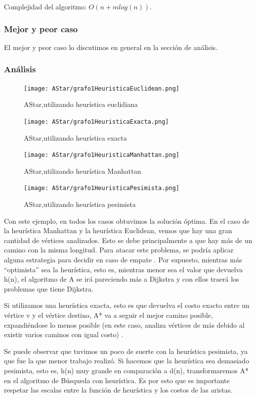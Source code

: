 Complejidad del algoritmo: $O(n + mlog(n))$.

\subsubsection{Mejor y peor caso}
El mejor y peor caso lo discutimos en general en la sección de análisis.
\subsubsection{Análisis}
\begin{figure}[H]
\centering
\texttt{[image: AStar/grafo1HeuristicaEuclidean.png]}
\caption{AStar,utilizando heurística euclidiana}
\end{figure}

\begin{figure}[H]
\centering
\texttt{[image: AStar/grafo1HeuristicaExacta.png]}
\caption{AStar,utilizando heurística exacta}
\end{figure}

\begin{figure}[H]
\centering
\texttt{[image: AStar/grafo1HeuristicaManhattan.png]}
\caption{AStar,utilizando heurística Manhattan}
\end{figure}

\begin{figure}[H]
\centering
\texttt{[image: AStar/grafo1HeuristicaPesimista.png]}
\caption{AStar,utilizando heurística pesimista}
\end{figure}

Con este ejemplo, en todos los casos obtuvimos la solución óptima. 
En el caso de la heurística Manhattan y la heurística Euclidean, vemos que hay una gran cantidad
de vértices analizados. Esto se debe principalmente a que hay más de un camino con la misma longitud.
Para atacar este problema, se podría aplicar alguna estrategia para decidir en caso de empate \cite{HEURISTICAS}.
Por supuesto, mientras más ``optimista'' sea la heurística, esto es, mientras menor sea el valor que devuelva h(n), 
el algoritmo de A\* se irá pareciendo más a Dijkstra y con ellos traerá los problemas que tiene Dijkstra.


Si utilizamos una heurística exacta, 
esto es que devuelva el costo exacto entre un vértice v y el vértice destino, 
A* va a seguir el mejor camino posible, expandiéndose lo menos posible (en este caso, 
analiza vértices de más debido al existir varios caminos con igual costo) \cite{HEURISTICAS}.


Se puede observar que tuvimos un poco de suerte con la heurística pesimista, ya que fue la que menor trabajo realizó.
Si hacemos que la heurística sea demasiado pesimista, esto es, h(n) muy grande en comparación a d(n), transformaremos 
A* en el algoritmo de Búsqueda con heurística. Es por esto que es importante respetar las escalas entre la función de heurística y los costos de las aristas.



